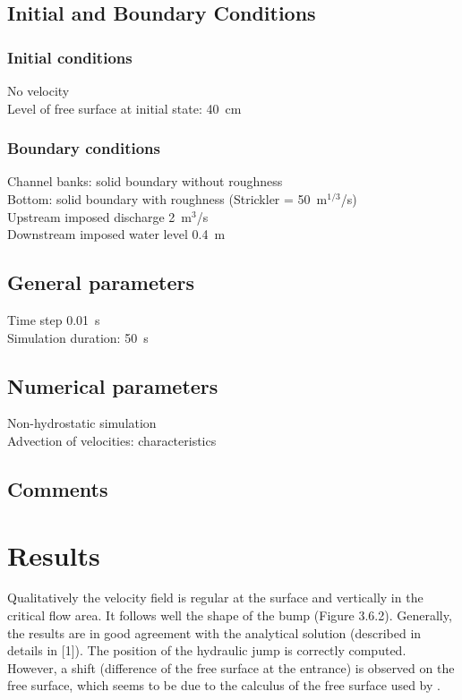 \subsection{Initial and Boundary Conditions}
%
\subsubsection{Initial conditions}
%
No velocity\\
Level of free surface at initial state: 40~cm
%
\subsubsection{Boundary conditions}
%
Channel banks: solid boundary without roughness\\
Bottom: solid boundary with roughness (Strickler = 50~m$^{1/3}$/s)\\
Upstream imposed discharge 2~m$^3$/s\\
Downstream imposed water level 0.4~m
%
\subsection{General parameters}
%
Time step 0.01~s\\
Simulation duration: 50~s
%
%
%
\subsection{Numerical parameters}
%
Non-hydrostatic simulation\\
Advection of velocities: characteristics
%
\subsection{Comments}
%
%
%
\section{Results}
%
Qualitatively the velocity field is regular at the surface and
vertically in the critical flow area.
It follows well the shape of the bump (Figure 3.6.2).
Generally, the results are in good agreement with the analytical
solution (described in details in [1]).
The position of the hydraulic jump is correctly computed.
However, a shift (difference of the free surface at the entrance) is
observed on the free surface, which seems to be due to the 
calculus of the free surface used by .
%

